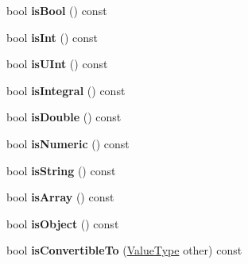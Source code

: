 \begin{DoxyCompactItemize}
\item 
\hypertarget{class_json_1_1_value_a2962a82330bfda787958a32f2053b207}{bool {\bfseries is\+Bool} () const }\label{class_json_1_1_value_a2962a82330bfda787958a32f2053b207}

\item 
\hypertarget{class_json_1_1_value_a822102727e339006210b46693fd871ca}{bool {\bfseries is\+Int} () const }\label{class_json_1_1_value_a822102727e339006210b46693fd871ca}

\item 
\hypertarget{class_json_1_1_value_af9aaddb86f470294a11c98be4970e896}{bool {\bfseries is\+U\+Int} () const }\label{class_json_1_1_value_af9aaddb86f470294a11c98be4970e896}

\item 
\hypertarget{class_json_1_1_value_a88581a41d916340df3173a52e73e64ac}{bool {\bfseries is\+Integral} () const }\label{class_json_1_1_value_a88581a41d916340df3173a52e73e64ac}

\item 
\hypertarget{class_json_1_1_value_a3254bc0372fa156ae2ce8916f70d9561}{bool {\bfseries is\+Double} () const }\label{class_json_1_1_value_a3254bc0372fa156ae2ce8916f70d9561}

\item 
\hypertarget{class_json_1_1_value_ada3d9bc4e416b973bd43175b3ef44fa5}{bool {\bfseries is\+Numeric} () const }\label{class_json_1_1_value_ada3d9bc4e416b973bd43175b3ef44fa5}

\item 
\hypertarget{class_json_1_1_value_a4dc1dffa66aae216624931d864ed30a9}{bool {\bfseries is\+String} () const }\label{class_json_1_1_value_a4dc1dffa66aae216624931d864ed30a9}

\item 
\hypertarget{class_json_1_1_value_a1b34e9957488a8b50539cbb0fa377119}{bool {\bfseries is\+Array} () const }\label{class_json_1_1_value_a1b34e9957488a8b50539cbb0fa377119}

\item 
\hypertarget{class_json_1_1_value_aa1c745d9f38e9d11b2088509794d79e3}{bool {\bfseries is\+Object} () const }\label{class_json_1_1_value_aa1c745d9f38e9d11b2088509794d79e3}

\item 
\hypertarget{class_json_1_1_value_a2e26afcbe12b5cb1adeaae36dde36202}{bool {\bfseries is\+Convertible\+To} (\hyperlink{namespace_json_a7d654b75c16a57007925868e38212b4e}{Value\+Type} other) const }\label{class_json_1_1_value_a2e26afcbe12b5cb1adeaae36dde36202}


\end{DoxyCompactItemize}
